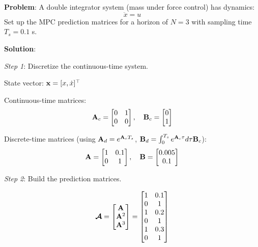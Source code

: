 \begin{examplebox}
\textbf{Problem}: A double integrator system (mass under force control) has dynamics:
\begin{equation}
    \ddot{x} = u
\end{equation}
Set up the MPC prediction matrices for a horizon of $N=3$ with sampling time $T_s = 0.1$ s.

\textbf{Solution}:

\textit{Step 1}: Discretize the continuous-time system.

State vector: $\mathbf{x} = [x, \dot{x}]^\top$

Continuous-time matrices:
\begin{equation}
    \mathbf{A}_c = \begin{bmatrix} 0 & 1 \\ 0 & 0 \end{bmatrix}, \quad
    \mathbf{B}_c = \begin{bmatrix} 0 \\ 1 \end{bmatrix}
\end{equation}

Discrete-time matrices (using $\mathbf{A}_d = e^{\mathbf{A}_c T_s}$, $\mathbf{B}_d = \int_0^{T_s} e^{\mathbf{A}_c \tau} d\tau \mathbf{B}_c$):
\begin{equation}
    \mathbf{A} = \begin{bmatrix} 1 & 0.1 \\ 0 & 1 \end{bmatrix}, \quad
    \mathbf{B} = \begin{bmatrix} 0.005 \\ 0.1 \end{bmatrix}
\end{equation}

\textit{Step 2}: Build the prediction matrices.

\begin{equation}
    \boldsymbol{\mathcal{A}} = \begin{bmatrix} \mathbf{A} \\ \mathbf{A}^2 \\ \mathbf{A}^3 \end{bmatrix} =
    \begin{bmatrix}
        1 & 0.1 \\
        0 & 1 \\
        1 & 0.2 \\
        0 & 1 \\
        1 & 0.3 \\
        0 & 1
    \end{bmatrix}
\end{equation}


\end{examplebox}

